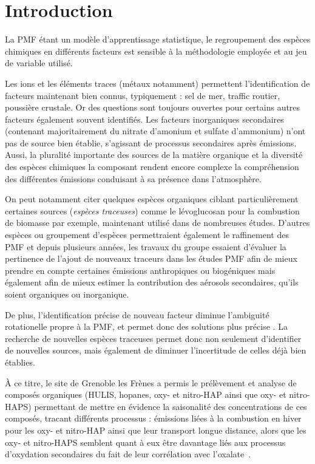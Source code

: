 
\section{Introduction}%
\label{sec:introduction}

La PMF étant un modèle d'apprentissage statistique, le regroupement des espèces chimiques
en différents facteurs est sensible à la méthodologie employée et au jeu de variable
utilisé.

Les ions et les éléments traces (métaux notamment) permettent l'identification de
facteurs
maintenant bien connus, typiquement : sel de mer, traffic routier, poussière crustale.
Or des questions sont toujours ouvertes pour certains autres facteurs également souvent
identifiés. Les facteurs inorganiques secondaires (contenant majoritairement du nitrate d'amonium et sulfate
d'ammonium) n'ont pas de source bien établie, s'agissant de processus secondaires après
émissions.
Aussi, la pluralité importante des sources de la matière organique et la diversité des
espèces chimiques la composant rendent encore complexe la compréhension des différentes
émissions conduisant à sa présence dans l'atmosphère.

On peut notamment citer quelques espèces organiques ciblant particulièrement certaines sources
(\textit{espèces traceuses}) comme le lévoglucosan pour la combustion de biomasse par
exemple, maintenant utilisé dans de nombreuses études.
D'autres espèces ou groupement d'espèces permettraient également le raffinement des PMF
et depuis plusieurs années, les travaux du groupe essaient d'évaluer la pertinence de
l'ajout de nouveaux traceurs dans les études PMF afin de mieux prendre en compte
certaines émissions anthropiques ou biogéniques mais également afin de mieux estimer la
contribution des aérosols secondaires, qu'ils soient organiques ou inorganique.

De plus, l'identification précise de nouveau facteur diminue l'ambiguité rotationelle
propre à la PMF, et permet donc des solutions plus précise \autocite{emamiEffect2017}.
La recherche de nouvelles espèces traceuses permet donc non seulement d'identifier de
nouvelles sources, mais également de diminuer l'incertitude de celles déjà bien établies.

À ce titre, le site de Grenoble les Frènes a permis le prélèvement et analyse de composés
organiques (HULIS, hopanes, oxy- et nitro-HAP ainsi que oxy- et nitro-HAPS) permettant de
mettre en évidence la saisonalité des concentrations de ces composés, tracant différents processus : émissions
liées à la combustion en hiver pour les oxy- et nitro-HAP ainsi que leur transport longue
distance, alors que les oxy- et nitro-HAPS semblent quant à eux être davantage liés aux
processus d'oxydation secondaires du fait de leur corrélation avec
l'oxalate~\autocite{tomazSources2017a}.

